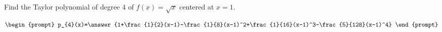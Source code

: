 \documentclass{ximera}
\author{Gregory Hartman \and Matthew Carr}
\begin{document}
\begin{exercise}




Find the Taylor polynomial of degree $4$ of $f(x)=\sqrt{x}$ centered at $x=1$.

\[
\begin{prompt}
p_{4}(x)=\answer{1+\frac{1}{2}(x-1)-\frac{1}{8}(x-1)^2+\frac{1}{16}(x-1)^3-\frac{5}{128}(x-1)^4}
\end{prompt}
\]

\end{exercise}
\end{document}
